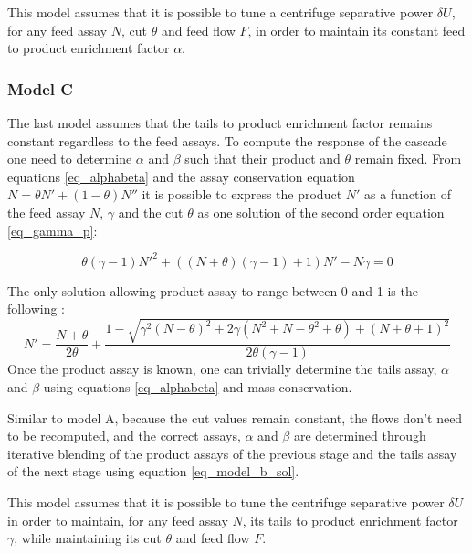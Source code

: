 
This model assumes that it is possible to tune a centrifuge separative power
$\delta U$, for any feed assay $N$, cut $\theta$ and feed flow $F$, in order to
maintain its constant feed to product enrichment factor $\alpha$.




\subsubsection{Model C}
The last model assumes that the tails to product enrichment factor remains
constant regardless to the feed assays. To compute the response of the cascade
one need to determine $\alpha$ and $\beta$ such that their product and
$\theta$ remain fixed.
From equations \eqref{eq_alphabeta} and the assay conservation equation $N =
\theta N' + (1-\theta)N''$ it is possible to express the product $N'$ as a function of
the feed assay $N$, $\gamma$ and the cut $\theta$ as one solution of the second
order equation \eqref{eq_gamma_p}:

\begin{equation}\label{eq_gamma_p}
    \theta(\gamma-1)N'^2+((N+\theta)(\gamma-1)+1)N'-N\gamma = 0
\end{equation}


The only solution allowing product assay to range between 0 and 1 is the
following :
\begin{equation}\label{eq_model_b_sol}
    N' = \frac{N+\theta}{2\theta} +
         \frac{1 - \sqrt{\gamma^{2}(N-\theta)^{2}
                         + 2\gamma( N^{2} + N - \theta^{2} + \theta)
                         + (N + \theta + 1)^{2}}}
              {2\theta(\gamma - 1)}
\end{equation}
Once the product assay is known, one can trivially determine the tails assay,
$\alpha$ and $\beta$ using equations \eqref{eq_alphabeta} and mass
conservation.

Similar to model A, because the cut values remain constant, the flows don't
need to be recomputed, and the correct assays, $\alpha$ and $\beta$ are
determined through iterative blending of the product assays of the previous
stage and the tails assay of the next stage using equation
\eqref{eq_model_b_sol}.

This model assumes that it is possible to tune the centrifuge separative power
$\delta U$ in order to maintain, for any feed assay $N$, its tails to product
enrichment factor $\gamma$, while maintaining its cut $\theta$ and feed flow
$F$.

